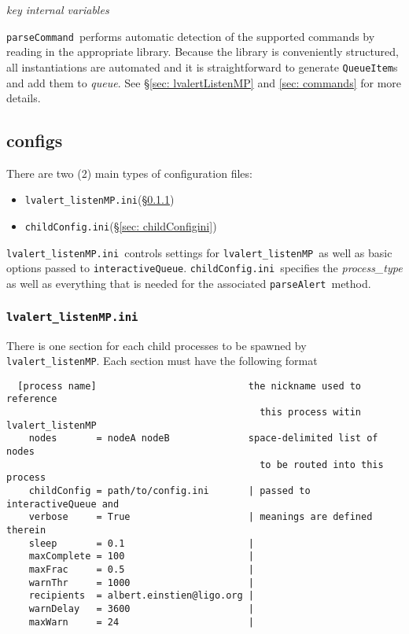 \documentclass{article}
\newcommand{\lvalertListenMP}{\texttt{lvalert\_listenMP}}
\newcommand{\interactiveQueue}{\texttt{interactiveQueue}}
\newcommand{\parseAlert}{\texttt{parseAlert}}
\newcommand{\parseCommand}{\texttt{parseCommand}}
\newcommand{\QueueItem}{\texttt{QueueItem}}
\newcommand{\lvalertMPini}{\texttt{lvalert\_listenMP.ini}}
\newcommand{\childConfigini}{\texttt{childConfig.ini}}
\begin{document}
\noindent
\textit{key internal variables}

\parseCommand~performs automatic detection of the supported commands by reading in the appropriate library. 
Because the library is conveniently structured, all instantiations are automated and it is straightforward to generate {\QueueItem}s and add them to \textit{queue}.
See \S\ref{sec: lvalertListenMP} and \ref{sec: commands} for more details.


\subsection{configs}
\label{sec: configs}

There are two (2) main types of configuration files:
\begin{itemize}
    \item{\lvalertMPini (\S\ref{sec: lvalertMPini})}
    \item{\childConfigini (\S\ref{sec: childConfigini})}
\end{itemize}
\lvalertMPini~controls settings for \lvalertListenMP~as well as basic options passed to \interactiveQueue.
\childConfigini~specifies the \textit{process\_type} as well as everything that is needed for the associated \parseAlert~method.


\subsubsection{\lvalertMPini}
\label{sec: lvalertMPini}

There is one section for each child processes to be spawned by \lvalertListenMP.
Each section must have the following format

\begin{verbatim}
  [process name]                           the nickname used to reference 
                                             this process witin lvalert_listenMP
    nodes       = nodeA nodeB              space-delimited list of nodes 
                                             to be routed into this process
    childConfig = path/to/config.ini       | passed to interactiveQueue and 
    verbose     = True                     | meanings are defined therein
    sleep       = 0.1                      |
    maxComplete = 100                      |
    maxFrac     = 0.5                      |
    warnThr     = 1000                     | 
    recipients  = albert.einstien@ligo.org |
    warnDelay   = 3600                     |
    maxWarn     = 24                       |
\end{verbatim}
\end{document}
